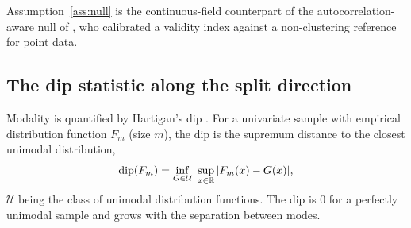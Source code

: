 Assumption~\ref{ass:null} is the continuous-field counterpart of the
autocorrelation-aware null of \citet{HennigLin2015}, who calibrated a
validity index against a non-clustering reference for point data.

\subsection{The dip statistic along the split direction}\label{subsec:dip}

Modality is quantified by Hartigan's dip \citep{HartiganHartigan1985}. For a
univariate sample with empirical distribution function $F_m$ (size $m$), the
dip is the supremum distance to the closest unimodal distribution,
\begin{equation}\label{eq:dip}
  \mathrm{dip}(F_m)=\inf_{G\in\mathcal U}\ \sup_{x\in\mathbb{R}}\,\lvert F_m(x)-G(x)\rvert,
\end{equation}
$\mathcal U$ being the class of unimodal distribution functions. The dip is
$0$ for a perfectly unimodal sample and grows with the separation between
modes.

